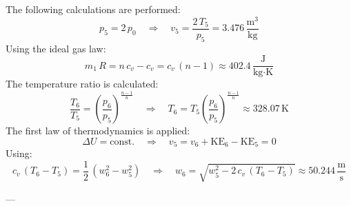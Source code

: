 The following calculations are performed:  
\[
p_5 = 2 \, p_0 \quad \Rightarrow \quad v_5 = \frac{2 \, T_5}{p_5} = 3.476 \, \frac{\text{m}^3}{\text{kg}}
\]  
Using the ideal gas law:  
\[
m_{1} \, R = n \, c_v - c_v = c_v \, (n-1) \approx 402.4 \, \frac{\text{J}}{\text{kg·K}}
\]  
The temperature ratio is calculated:  
\[
\frac{T_6}{T_5} = \left( \frac{p_6}{p_5} \right)^{\frac{n-1}{n}} \quad \Rightarrow \quad T_6 = T_5 \left( \frac{p_6}{p_5} \right)^{\frac{n-1}{n}} \approx 328.07 \, \text{K}
\]  
The first law of thermodynamics is applied:  
\[
\Delta U = \text{const.} \quad \Rightarrow \quad v_5 = v_6 + \text{KE}_6 - \text{KE}_5 = 0
\]  
Using:  
\[
c_v \, (T_6 - T_5) = \frac{1}{2} \, (w_6^2 - w_5^2) \quad \Rightarrow \quad w_6 = \sqrt{w_5^2 - 2 \, c_v \, (T_6 - T_5)} \approx 50.244 \, \frac{\text{m}}{\text{s}}
\]

---